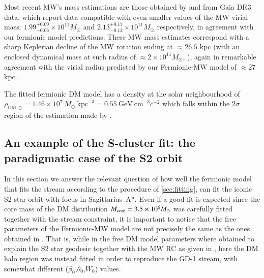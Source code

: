 \documentclass[twocolumn]{aa}
\begin{document}
Most recent MW's mass estimations are those obtained by
\citet{Jiao2023} and \citet{Ou2023} from Gaia DR3 data, which report data compatible with even smaller values of the MW virial mass: $1.99^{+0.09}_{-0.06}\times10^{11} M_\odot$ and $2.13^{+0.17}_{-0.12}\times10^{11} M_\odot$ respectively, in agreement with our fermionic model predictions. These MW mass estimates correspond with a sharp Keplerian decline of the MW rotation ending at $\approx 26.5$ kpc (with an enclosed dynamical mass at such radius of $\approx 2\times 10^{11} M_\odot$, \citealp{Jiao2023}), again in remarkable agreement with the virial radius predicted by our Fermionic-MW model of $\approx 27$ kpc.

The fitted fermionic DM model has a density at the solar neighbourhood of
$\rho_{\mathrm{DM},\odot}=1.46\times10^7~M_\odot~\mathrm{kpc}^{-3}=0.55~\mathrm{GeV~cm}^{-3} c^{-2}$ which falls within the $2\sigma$ region of the estimation made by \citet{Salucci2010}.

\subsection{An example of the S-cluster fit: the paradigmatic case of the S2 orbit}
In this section we answer the relevant question of how well the fermionic model that fits the stream according to the procedure of \cref{sec:fitting}, can fit the iconic S2 star orbit with focus in Sagittarius~A*. Even if a good fit is expected since the core mass of the DM distribution $M_{\rm{core}}=3.5\times 10^6 M_\odot$ was carefully fitted together with the stream constraint, it is important to notice that the free parameters of the Fermionic-MW model are not precisely the same as the ones obtained in \cite{2020A&A...641A..34B}. That is, while in \cite{2020A&A...641A..34B} the free DM model parameters where obtained to explain the S2 star geodesic together with the MW RC as given in \cite{sofue_rotation_2013}, here the DM halo region was instead fitted in order to reproduce the GD-1 stream, with somewhat different ($\beta_0$,$\theta_0$,$W_0$) values.
\end{document}
